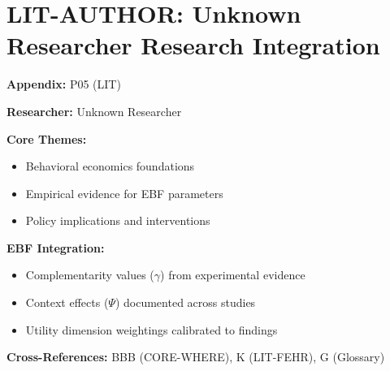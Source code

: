 %
%

\chapter{LIT-AUTHOR: Unknown Researcher Research Integration}
\label{app:p05}

\begin{abstract}
This appendix integrates the research contributions of Unknown Researcher into the
Evidence-Based Framework. It documents key papers, core findings, and their
integration with EBF dimensions including complementarity parameters ($\gamma$),
context factors ($\Psi$), and utility dimensions.
\end{abstract}

\begin{tcolorbox}[colback=blue!5!white, colframe=blue!75!black,
    title=Quick Reference: Unknown Researcher Research]

\textbf{Appendix:} P05 (LIT)

\textbf{Researcher:} Unknown Researcher

\textbf{Core Themes:}
\begin{itemize}[nosep]
\item Behavioral economics foundations
\item Empirical evidence for EBF parameters
\item Policy implications and interventions
\end{itemize}

\textbf{EBF Integration:}
\begin{itemize}[nosep]
\item Complementarity values ($\gamma$) from experimental evidence
\item Context effects ($\Psi$) documented across studies
\item Utility dimension weightings calibrated to findings
\end{itemize}

\textbf{Cross-References:} BBB (CORE-WHERE), K (LIT-FEHR), G (Glossary)
\end{tcolorbox}


